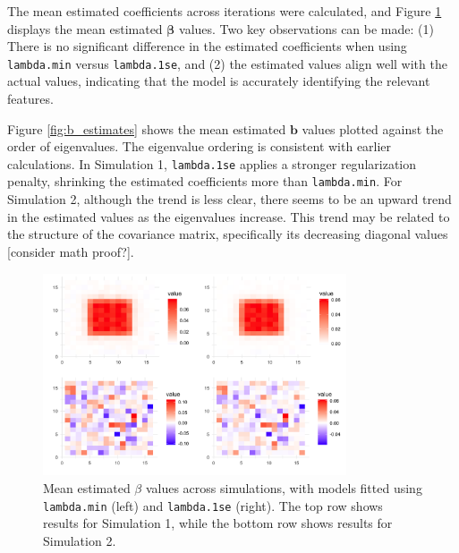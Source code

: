 \documentclass[12pt]{article}
\begin{document}
The mean estimated coefficients across iterations were calculated, and Figure \ref{fig:beta_estimates} displays the mean estimated \( \boldsymbol{\beta} \) values. Two key observations can be made: (1) There is no significant difference in the estimated coefficients when using \texttt{lambda.min} versus \texttt{lambda.1se}, and (2) the estimated values align well with the actual values, indicating that the model is accurately identifying the relevant features.

Figure \ref{fig:b_estimates} shows the mean estimated \( \mathbf{b} \) values plotted against the order of eigenvalues. The eigenvalue ordering is consistent with earlier calculations. In Simulation 1, \texttt{lambda.1se} applies a stronger regularization penalty, shrinking the estimated coefficients more than \texttt{lambda.min}. For Simulation 2, although the trend is less clear, there seems to be an upward trend in the estimated values as the eigenvalues increase. This trend may be related to the structure of the covariance matrix, specifically its decreasing diagonal values [consider math proof?].

\begin{figure}[h!]
	\centering
	\includegraphics[width=0.8\textwidth]{beta_estimates.png}
	\caption{Mean estimated \( \beta \) values across simulations, with models fitted using \texttt{lambda.min} (left) and
		\texttt{lambda.1se} (right). The top row shows results for Simulation 1, while the bottom row shows results for Simulation 2.}
	\label{fig:beta_estimates}
\end{figure}
\end{document}
